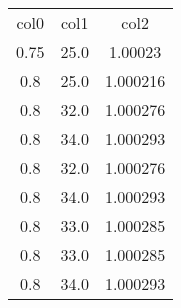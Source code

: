 \begin{table}
\begin{tabular}{ccc}
col0 & col1 & col2 \\
0.75 & 25.0 & 1.00023 \\
0.8 & 25.0 & 1.000216 \\
0.8 & 32.0 & 1.000276 \\
0.8 & 34.0 & 1.000293 \\
0.8 & 32.0 & 1.000276 \\
0.8 & 34.0 & 1.000293 \\
0.8 & 33.0 & 1.000285 \\
0.8 & 33.0 & 1.000285 \\
0.8 & 34.0 & 1.000293 \\
\end{tabular}
\end{table}
